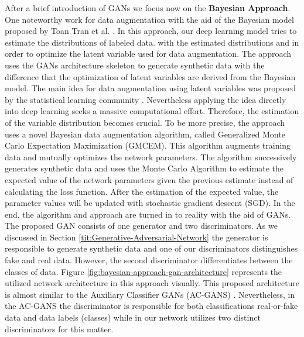 After a brief introduction of GANs we focus now on the \textbf{Bayesian Approach}. One noteworthy work for data augmentation with the aid of the Bayesian model proposed by Toan Tran
et al. \cite{refrence_bayesian_approach}. In this approach, our deep learning model tries to estimate the
distributions of labeled data. with the estimated distributions and in order to optimize the latent
variable used for data augmentation. The approach uses the GANs architecture skeleton to generate
synthetic data with the difference that the optimization of latent variables are derived from the Bayesian model.
The main idea for data augmentation using latent variables was proposed by the statistical learning
community \cite{Statistical_data_augmentation}. Nevertheless applying the idea directly into deep
learning seeks a massive computational effort. Therefore, the estimation of the variable
distribution becomes crucial. To be more precise, the
approach uses a novel Bayesian data augmentation algorithm, called Generalized Monte Carlo Expectation Maximization
(GMCEM). This algorithm augments training data and mutually optimizes the network parameters. The
algorithm successively generates synthetic data and uses the Monte Carlo Algorithm to estimate the expected value
of the network parameters given the previous estimate instead of calculating the loss function. After
the estimation of the expected value, the parameter values will be updated with stochastic gradient
descent (SGD). In the end, the algorithm and approach are turned in to reality with the aid of GANs. The
proposed GAN consists of one generator and two discriminators. As we discussed in Section
\ref{tit:Generative-Adversarial-Network} the generator is responsible to generate
synthetic data and one of our discriminators distinguishes fake and real data. However, the second
discriminator differentiates between the classes of data. Figure
\ref{fig:bayesian-approach-gan-architecture} represents the utilized network architecture in this
approach visually. This proposed architecture is almost similar to the Auxiliary Classifier GANs
(AC-GANS) \cite{AC_GANS}. Nevertheless, in the AC-GANS the discriminator is responsible for both
classifications real-or-fake data and data labels (classes) while in our network utilizes two
distinct discriminators for this matter.

